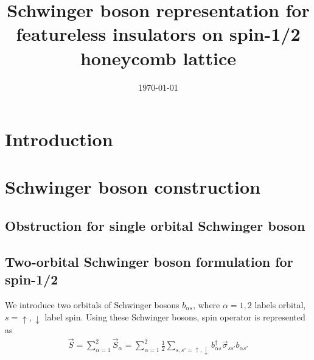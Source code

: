 \documentclass[%
 reprint,
 amsmath,amssymb,
 aps,
 pra, %
]{revtex4-1}
\newcommand{\dg}{\dagger}
\begin{document}
\title{Schwinger boson representation for featureless insulators on spin-1/2 honeycomb lattice}



\date{\today}

\begin{abstract}
  
\end{abstract}

\maketitle

\tableofcontents

\section{Introduction}


\section{Schwinger boson construction}
\subsection{Obstruction for single orbital Schwinger boson}
\subsection{Two-orbital Schwinger boson formulation for spin-1/2}
We introduce two orbitals of Schwinger bosons $b_{\alpha s}$, where $\alpha=1,2$ labels orbital, $s=\uparrow,\downarrow$ label spin. 
Using these Schwinger bosons, spin operator is represented as
\begin{align}
  \vec{S}=\sum_{\alpha=1}^2\vec{S}_\alpha=\sum_{\alpha=1}^2\frac{1}{2}\sum_{s,s'=\uparrow,\downarrow}b_{\alpha s}^\dg\vec{\sigma}_{ss'}b_{\alpha s'}
  \label{}
\end{align}
\end{document}
